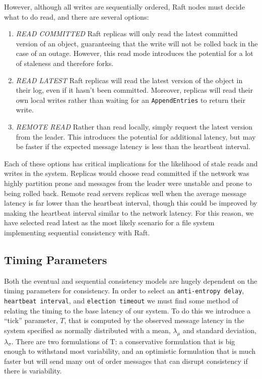 \documentclass[10pt,conference,letterpaper]{IEEEtran}
\begin{document}
However, although all writes are sequentially ordered, Raft nodes must decide what to do read, and there are several options:

\begin{enumerate}
    \item \textit{READ COMMITTED} Raft replicas will only read the latest committed version of an object, guaranteeing that the write will not be rolled back in the case of an outage. However, this read mode introduces the potential for a lot of staleness and therefore forks.
    \item \textit{READ LATEST} Raft replicas will read the latest version of the object in their log, even if it hasn't been committed. Moreover, replicas will read their own local writes rather than waiting for an \texttt{AppendEntries} to return their write.
    \item \textit{REMOTE READ} Rather than read locally, simply request the latest version from the leader. This introduces the potential for additional latency, but may be faster if the expected message latency is less than the heartbeat interval.
\end{enumerate}

Each of these options has critical implications for the likelihood of stale reads and writes in the system. Replicas would choose read committed if the network was highly partition prone and messages from the leader were unstable and prone to being rolled back. Remote read servers replicas well when the average message latency is far lower than the heartbeat interval, though this could be improved by making the heartbeat interval similar to the network latency. For this reason, we have selected read latest as the most likely scenario for a file system implementing sequential consistency with Raft.

\subsection{Timing Parameters}

Both the eventual and sequential consistency models are hugely dependent on the timing parameters for consistency. In order to select an \texttt{anti-entropy delay}, \texttt{heartbeat interval}, and \texttt{election timeout} we must find some method of relating the timing to the base latency of our system. To do this we introduce a ``tick'' parameter, $T$, that is computed by the observed message latency in the system specified as normally distributed with a mean, $\lambda_{\mu}$ and standard deviation, $\lambda_{\sigma}$. There are two formulations of T: a conservative formulation that is big enough to withstand most variability, and an optimistic formulation that is much faster but will send many out of order messages that can disrupt consistency if there is variability.
\end{document}

